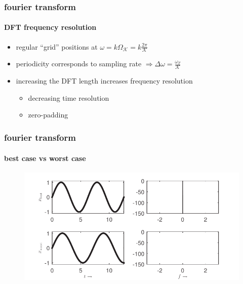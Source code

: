 	\begin{frame}\frametitle{fourier transform}\framesubtitle{DFT frequency resolution}
        \begin{itemize}
            \item   regular ``grid'' positions at $\omega = k\Omega_\mathcal{K} = k\frac{2\pi}{\mathcal{K}}$
            \pause
            \item   periodicity corresponds to sampling rate $\Rightarrow \Delta\omega = \frac{\omega_T}{\mathcal{K}}$
            \pause
            \item   increasing the DFT length increases frequency resolution
                \begin{itemize}
                    \item   decreasing time resolution
                    \item   zero-padding
                \end{itemize}
        \end{itemize}
	\end{frame}	
	\begin{frame}\frametitle{fourier transform}\framesubtitle{best case vs worst case}
		\begin{figure}
			\centering
				\includegraphics[scale=.7]{graph/bestworstcase}
		\end{figure}
	\end{frame}	

